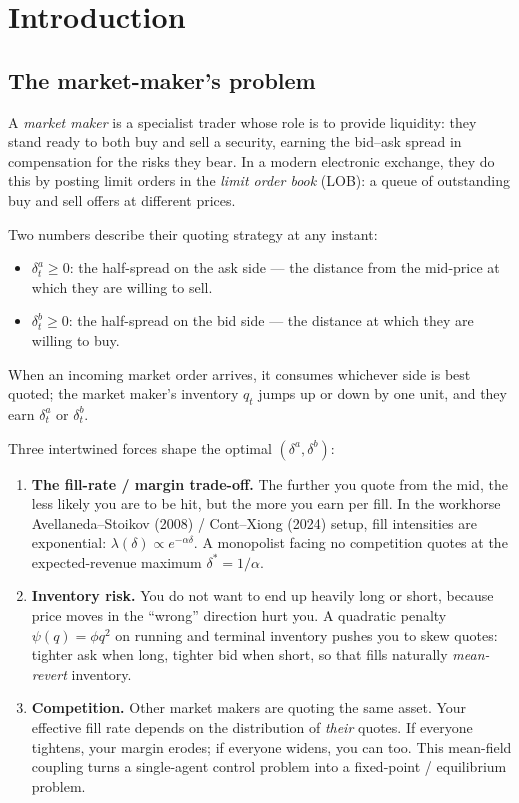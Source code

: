 \chapter{Introduction}
\label{ch:intro}

\section{The market-maker's problem}

A \emph{market maker} is a specialist trader whose role is to provide liquidity: they stand ready to both buy and sell a security, earning the bid--ask spread in compensation for the risks they bear. In a modern electronic exchange, they do this by posting limit orders in the \emph{limit order book} (LOB): a queue of outstanding buy and sell offers at different prices.

Two numbers describe their quoting strategy at any instant:
\begin{itemize}
  \item $\delta^a_t \geq 0$: the half-spread on the ask side --- the distance from the mid-price at which they are willing to sell.
  \item $\delta^b_t \geq 0$: the half-spread on the bid side --- the distance at which they are willing to buy.
\end{itemize}
When an incoming market order arrives, it consumes whichever side is best quoted; the market maker's inventory $q_t$ jumps up or down by one unit, and they earn $\delta^a_t$ or $\delta^b_t$.

Three intertwined forces shape the optimal $(\delta^a, \delta^b)$:

\begin{enumerate}[leftmargin=2em]
\item \textbf{The fill-rate / margin trade-off.}  The further you quote from the mid, the less likely you are to be hit, but the more you earn per fill. In the workhorse Avellaneda--Stoikov (2008) \cite{avellaneda2008} / Cont--Xiong (2024) \cite{cont2024} setup, fill intensities are exponential: $\lambda(\delta) \propto e^{-\alpha \delta}$. A monopolist facing no competition quotes at the expected-revenue maximum $\delta^* = 1/\alpha$.
\item \textbf{Inventory risk.}  You do not want to end up heavily long or short, because price moves in the ``wrong'' direction hurt you. A quadratic penalty $\psi(q) = \phi q^2$ on running and terminal inventory pushes you to skew quotes: tighter ask when long, tighter bid when short, so that fills naturally \emph{mean-revert} inventory.
\item \textbf{Competition.}  Other market makers are quoting the same asset. Your effective fill rate depends on the distribution of \emph{their} quotes. If everyone tightens, your margin erodes; if everyone widens, you can too. This mean-field coupling turns a single-agent control problem into a fixed-point / equilibrium problem.
\end{enumerate}

